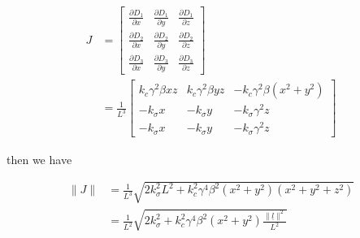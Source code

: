 \begin{derivation}


	\begin{equation}
		\begin{aligned}
			J & =
			\begin{bmatrix}
				\frac{\partial D_{1}}{\partial x} & \frac{\partial D_{1}}{\partial y} & \frac{\partial D_{1}}{\partial z} \\
				\frac{\partial D_{2}}{\partial x} & \frac{\partial D_{2}}{\partial y} & \frac{\partial D_{2}}{\partial z} \\
				\frac{\partial D_{3}}{\partial x} & \frac{\partial D_{3}}{\partial y} & \frac{\partial D_{3}}{\partial z}
			\end{bmatrix}
			\\
			  & =  \frac{1}{L^3}
			\begin{bmatrix}
				k_c \gamma^2 \beta xz & k_c \gamma^2 \beta yz & - k_c \gamma^2 \beta (x^2 +y^2) \\
				-k_\sigma x           & -k_\sigma y           & -k_\sigma\gamma^2 z             \\
				-k_\sigma x           & -k_\sigma y           & -k_\sigma\gamma^2 z
			\end{bmatrix}
		\end{aligned}
	\end{equation}

	then we have

	\begin{equation}
		\begin{aligned}
			\| J \| & = \frac{1}{L^3} \sqrt{ 2 k_\sigma^2 L^2 + k_c^2 \gamma^4 \beta^2  (x^2+y^2)( x^2 + y^2 + z^2 )}          \\
			        & = \frac{1}{L^2} \sqrt{ 2 k_\sigma^2 + k_c^2 \gamma^4 \beta^2 (x^2+y^2) \frac{\|\underline{l}\|^2}{L^2} }
		\end{aligned}
	\end{equation}

\end{derivation}

